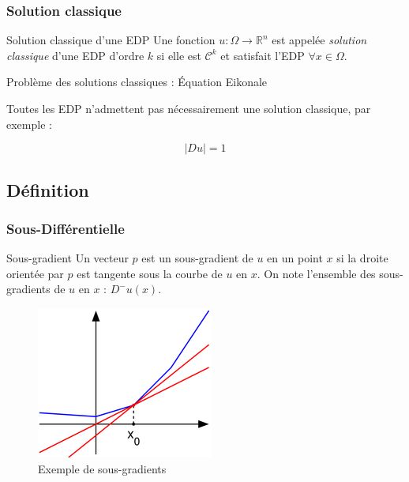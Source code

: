 \documentclass[10pt]{beamer}
\begin{document}
\begin{frame}
\frametitle{Solution classique}
\begin{block}{Solution classique d'une EDP}
Une fonction $u : \Omega \to \mathbb{R}^n$ est appelée \emph{solution classique} d'une EDP d'ordre $k$ si elle est $\mathcal{C}^k$ et satisfait l'EDP $\forall x \in \Omega$.
\end{block}

\begin{block}{Problème des solutions classiques : Équation Eikonale}

Toutes les EDP n'admettent pas nécessairement une solution classique, par exemple :

$$ |Du| = 1 $$

\end{block}

\end{frame}

\subsection{Définition}

\begin{frame}
\frametitle{Sous-Différentielle}
\begin{block}{Sous-gradient}
Un vecteur $p$ est un sous-gradient de $u$ en un point $x$ si la droite orientée par $p$ est tangente sous la courbe de $u$ en $x$.
On note l'ensemble des sous-gradients de $u$ en $x$ : $D^{-}u(x)$.
\end{block}
\begin{figure}
\begin{center}
\includegraphics[scale=0.4]{sousdiff.png}
\caption{Exemple de sous-gradients}
\end{center}
\end{figure}
\end{frame}
\end{document}
